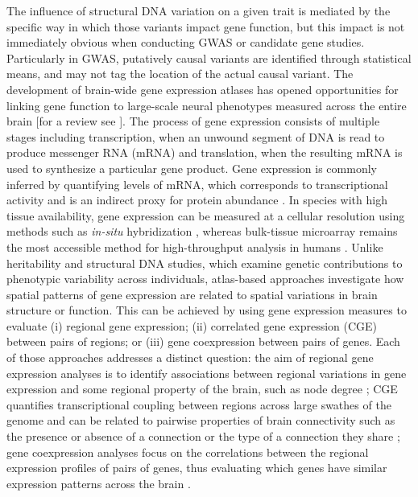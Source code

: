 The influence of structural DNA variation on a given trait is mediated by the specific way in which those variants impact gene function, but this impact is not immediately obvious when conducting GWAS or candidate gene studies. Particularly in GWAS, putatively causal variants are identified through statistical means, and may not tag the location of the actual causal variant. The development of brain-wide gene expression atlases \citep{Harris2010,Hawrylycz2012,Lein2007a} has opened opportunities for linking gene function to large-scale neural phenotypes measured across the entire brain [for a review see \citet{Fornito2019}]. The process of gene expression consists of multiple stages including transcription, when an unwound segment of DNA is read to produce messenger RNA (mRNA) and translation, when the resulting mRNA is used to synthesize a particular gene product. Gene expression is commonly inferred by quantifying levels of mRNA, which corresponds to transcriptional activity and is an indirect proxy for protein abundance \citep{Liu2016}. In species with high tissue availability, gene expression can be measured at a cellular resolution using methods such as \textit{in-situ} hybridization \citep{Lein2007a,Unger2010}, whereas bulk-tissue microarray \citep{Schulze2001} remains the most accessible method for high-throughput analysis in humans \citep{Hawrylycz2012}. Unlike heritability and structural DNA studies, which examine genetic contributions to phenotypic variability across individuals, atlas-based approaches investigate how spatial patterns of gene expression are related to spatial variations in brain structure or function. This can be achieved by using gene expression measures to evaluate (i) regional gene expression; (ii) correlated gene expression (CGE) between pairs of regions; or (iii) gene coexpression between pairs of genes. Each of those approaches addresses a distinct question: the aim of regional gene expression analyses is to identify associations between regional variations in gene expression and some regional property of the brain, such as node degree \citep{French2011}; CGE quantifies transcriptional coupling between regions across large swathes of the genome and can be related to pairwise properties of brain connectivity such as the presence or absence of a connection or the type of a connection they share \citep{Arnatkeviciute2018,Fulcher2016,Richiardi2015}; gene coexpression analyses focus on the correlations between the regional expression profiles of pairs of genes, thus evaluating which genes have similar expression patterns across the brain \citep{Forest2017}.

